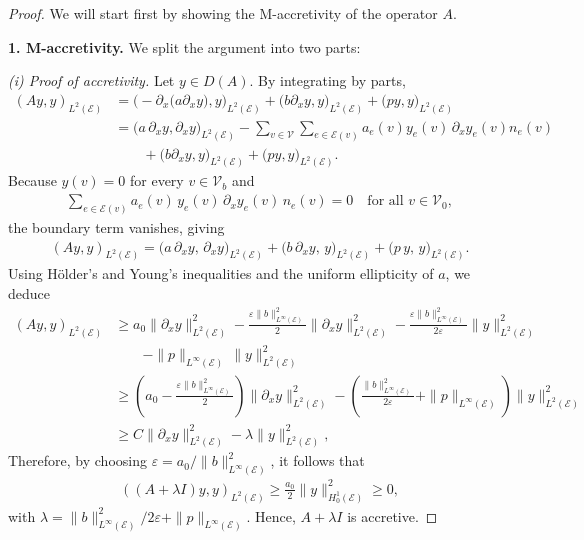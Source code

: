 \documentclass[10pt,a4paper]{amsart}
\begin{document}
\begin{proof}
We will start first by showing the M-accretivity of the operator $A$.
\smallbreak

\noindent
\textbf{1. M-accretivity.}
We split the argument into two parts: 

\smallbreak
\textit{(i) Proof of accretivity.} Let $y \in D(A)$. By integrating by parts,
\begin{align*}
(Ay,y)_{L^2(\mathcal{E})} 
&= 
\bigl(-\partial_x\bigl(a\partial_x y\bigr),y\bigr)_{L^2(\mathcal{E})}
+\bigl(b\partial_x y,y\bigr)_{L^2(\mathcal{E})}
+\bigl(py,y\bigr)_{L^2(\mathcal{E})}
\\
&= 
\bigl(a\,\partial_x y,\partial_x y\bigr)_{L^2(\mathcal{E})}
-
\sum_{v \in \mathcal{V}}\sum_{e \in \mathcal{E}(v)}
a_e(v)y_e(v)\,\partial_x y_e(v)n_e(v)\\
&\qquad+\bigl(b\partial_x y,y\bigr)_{L^2(\mathcal{E})}+\bigl(py,y\bigr)_{L^2(\mathcal{E})}.
\end{align*}
Because $y(v)=0$ for every $v \in \mathcal{V}_b$ and 
\begin{align*}
\sum_{e \in \mathcal{E}(v)} a_e(v)\,y_e(v)\,\partial_x y_e(v)\,n_e(v) 
= 0
\quad 
\text{for all } v \in \mathcal{V}_0,
\end{align*}
the boundary term vanishes, giving
\begin{align*}
(Ay,y)_{L^2(\mathcal{E})}
=
\bigl(a\,\partial_x y,\,\partial_x y\bigr)_{L^2(\mathcal{E})}
+\bigl(b\,\partial_x y,\,y\bigr)_{L^2(\mathcal{E})}
+\bigl(p\,y,\,y\bigr)_{L^2(\mathcal{E})}.
\end{align*}
Using Hölder’s and Young’s inequalities and the uniform ellipticity of $a$, we deduce
\begin{align*}
(Ay,y)_{L^2(\mathcal{E})}
&\geq 
a_0\|\partial_x y\|_{L^2(\mathcal{E})}^2
-
\frac{\varepsilon\|b\|_{L^\infty(\mathcal{E})}^2}{2}\|\partial_x y\|_{L^2(\mathcal{E})}^2-\frac{\varepsilon\|b\|_{L^\infty(\mathcal{E})}^2}{2\varepsilon}\|y\|_{L^2(\mathcal{E})}^2\\
&\qquad
-
\|p\|_{L^\infty(\mathcal{E})}\,\|y\|_{L^2(\mathcal{E})}^2\\
&\geq \left(a_0-\frac{\varepsilon\|b\|_{L^\infty(\mathcal{E})}^2}{2}\right)\|\partial_x y\|_{L^2(\mathcal{E})}^2 - \left(\frac{\|b\|_{L^\infty(\mathcal{E})}^2}{2\varepsilon}+\|p\|_{L^\infty(\mathcal{E})}\right)\|y\|_{L^2(\mathcal{E})}^2\\
&\geq C\|\partial_x y\|_{L^2(\mathcal{E})}^2 -\lambda\|y\|_{L^2(\mathcal{E})}^2, 
\end{align*}
Therefore, by choosing $\varepsilon = a_0/\|b\|_{L^\infty(\mathcal{E})}^2$, it follows that
\begin{align}\label{eq:momotonicity}
    ((A+\lambda I )y,y)_{L^2(\mathcal{E})}\geq \frac{a_0}{2}\| y\|_{H_0^1(\mathcal{E})}^2\geq 0,
\end{align}
with $\lambda = \|b\|_{L^\infty(\mathcal{E})}^2/2\varepsilon+\|p\|_{L^\infty(\mathcal{E})}$. Hence, $A +\lambda I$ is accretive.


\end{proof}
\end{document}
